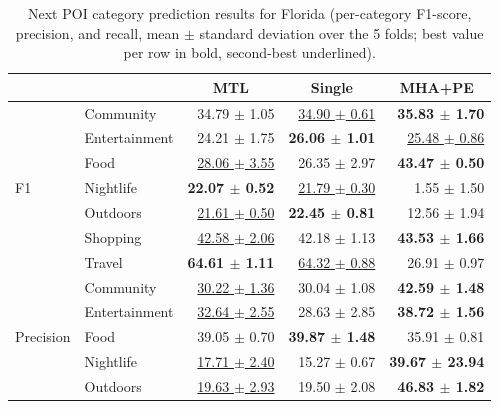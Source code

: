 \begin{table}[htbp]
\caption{Next POI category prediction results for Florida (per-category F1-score, precision, and recall, mean $\pm$ standard deviation over the 5 folds; best value per row in bold, second-best underlined).}
\label{tab:cbic:next}
\centering
\begin{tabular}{llrrr}
\toprule
 & & \multicolumn{1}{c}{\textbf{MTL}} & \multicolumn{1}{c}{\textbf{Single}} & \multicolumn{1}{c}{\textbf{MHA+PE}} \\
\midrule
\multirow{7}{*}{F1}        & Community     & 34.79 $\pm$ 1.05             & \underline{34.90 $\pm$ 0.61} & \textbf{35.83 $\pm$ 1.70} \\
                           & Entertainment & 24.21 $\pm$ 1.75             & \textbf{26.06 $\pm$ 1.01}    & \underline{25.48 $\pm$ 0.86} \\
                           & Food          & \underline{28.06 $\pm$ 3.55} & 26.35 $\pm$ 2.97             & \textbf{43.47 $\pm$ 0.50} \\
                           & Nightlife     & \textbf{22.07 $\pm$ 0.52}    & \underline{21.79 $\pm$ 0.30} & 1.55 $\pm$ 1.50 \\
                           & Outdoors      & \underline{21.61 $\pm$ 0.50} & \textbf{22.45 $\pm$ 0.81}    & 12.56 $\pm$ 1.94 \\
                           & Shopping      & \underline{42.58 $\pm$ 2.06} & 42.18 $\pm$ 1.13             & \textbf{43.53 $\pm$ 1.66} \\
                           & Travel        & \textbf{64.61 $\pm$ 1.11}    & \underline{64.32 $\pm$ 0.88} & 26.91 $\pm$ 0.97 \\
\midrule
\multirow{7}{*}{Precision} & Community     & \underline{30.22 $\pm$ 1.36} & 30.04 $\pm$ 1.08             & \textbf{42.59 $\pm$ 1.48} \\
                           & Entertainment & \underline{32.64 $\pm$ 2.55} & 28.63 $\pm$ 2.85             & \textbf{38.72 $\pm$ 1.56} \\
                           & Food          & 39.05 $\pm$ 0.70             & \textbf{39.87 $\pm$ 1.48}    & 35.91 $\pm$ 0.81 \\
                           & Nightlife     & \underline{17.71 $\pm$ 2.40} & 15.27 $\pm$ 0.67             & \textbf{39.67 $\pm$ 23.94} \\
                           & Outdoors      & \underline{19.63 $\pm$ 2.93} & 19.50 $\pm$ 2.08             & \textbf{46.83 $\pm$ 1.82} \\

\end{tabular}
\end{table}
